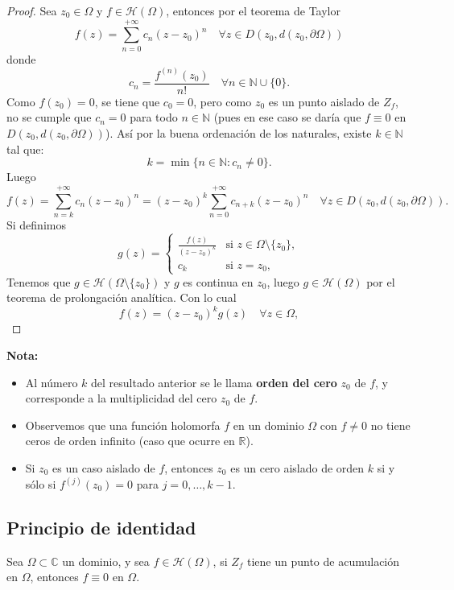\begin{proof}
    Sea $z_0 \in \Omega$ y $f \in \mathcal{H}(\Omega)$, entonces por el teorema de Taylor 
    \[
        f(z) = \sum_{n=0}^{+\infty} c_n (z - z_0)^n \quad \forall z \in D(z_0, d(z_0, \partial \Omega))
    \]
    donde
    \[
        c_n = \frac{f^{(n)}(z_0)}{n!} \quad \forall n \in \mathbb{N} \cup \{0\}.
    \]
    Como $f(z_0) = 0$, se tiene que $c_0 = 0$, pero como $z_0$ es un punto aislado de $Z_f$, no se cumple que $c_n = 0$ para todo $n \in \mathbb{N}$ (pues en ese caso se daría que $f \equiv 0$ en $D(z_0, d(z_0, \partial \Omega))$). Así por la buena ordenación de los naturales, existe $k \in \mathbb{N}$ tal que:
    \[
        k = \min \{ n \in \mathbb{N} : c_n \neq 0 \}.
    \]
    Luego 
    \[
        f(z) = \sum_{n=k}^{+\infty} c_n (z - z_0)^n = (z - z_0)^k \sum_{n=0}^{+\infty} c_{n+k} (z - z_0)^n \quad \forall z \in D(z_0, d(z_0, \partial \Omega)).
    \]
    Si definimos 
    \[
        g(z) = \begin{cases}
            \frac{f(z)}{(z - z_0)^k} & \text{si } z \in \Omega \setminus \{ z_0 \}, \\
            c_k & \text{si } z = z_0,
        \end{cases}
    \]
    Tenemos que $g \in \mathcal{H}(\Omega \setminus \{ z_0 \})$ y $g$ es continua en $z_0$, luego $g \in \mathcal{H}(\Omega)$ por el teorema de prolongación analítica. Con lo cual
    \[
        f(z) = (z - z_0)^k g(z) \quad \forall z \in \Omega,
    \]
\end{proof}

\textbf{Nota:}
\begin{itemize}
    \item Al número $k$ del resultado anterior se le llama \textbf{orden del cero} $z_0$ de $f$, y corresponde a la multiplicidad del cero $z_0$ de $f$.
    \item Observemos que una función holomorfa $f$ en un dominio $\Omega$ con $f \neq 0$ no tiene ceros de orden infinito (caso que ocurre en $\mathbb{R}$).
    \item Si $z_0$ es un caso aislado de $f$, entonces $z_0$ es un cero aislado de orden $k$ si y sólo si $f^{(j)}(z_0) = 0$ para $j = 0, \ldots, k-1$.
\end{itemize}

\subsection{Principio de identidad}

\begin{teorema} 
    Sea $\Omega \subset \mathbb{C}$ un dominio, y sea $f \in \mathcal{H}(\Omega)$, si $Z_f$ tiene un punto de acumulación en $\Omega$, entonces $f \equiv 0$ en $\Omega$.    
\end{teorema}

